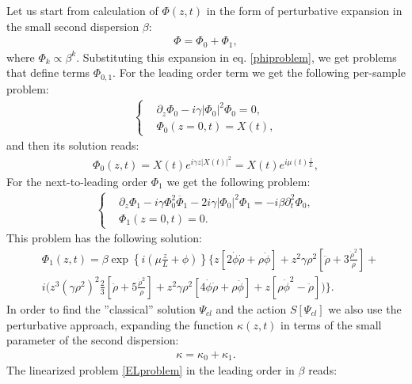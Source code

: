 \documentclass{article}
\begin{document}
Let us start from calculation of $\Phi(z,t)$ in the form of perturbative expansion in the small second dispersion $\beta$:
\begin{eqnarray}\label{Phidecomposed}
    \Phi = \Phi_{0} + \Phi_{1},
\end{eqnarray}
where $\Phi_{k} \propto \beta^{k}$. Substituting this expansion in eq. \eqref{phiproblem}, we get problems that define terms $\Phi_{0,1}$. For the leading order term we get the following per-sample problem:
\begin{eqnarray}\label{phiproblemzero}
    \begin{cases}
        &\partial_{z}\Phi_{0} - i\gamma|\Phi_{0}|^{2} \Phi_{0} = 0,\\
        &\Phi_{0}(z = 0, t) = X(t),
    \end{cases}
\end{eqnarray}
and then its solution reads: 
\begin{eqnarray}
\Phi_{0}(z,t) = X(t)e^{i\gamma z |X(t)|^{2}} = X(t)e^{i\mu(t)\frac{z}{L}},
\end{eqnarray}
For the next-to-leading order $\Phi_{1}$ we get the following problem: 
\begin{eqnarray}\label{phiproblemone}
    \begin{cases}
        &\partial_{z}\Phi_{1} -i\gamma\Phi^2_{0}\overline{\Phi}_{1} - 2i\gamma|\Phi_{0}|^2\Phi_{1} = -i\beta\partial^2_{t}\Phi_{0},\\
        &\Phi_{1}(z = 0, t) = 0.
    \end{cases}
\end{eqnarray}
This problem has the following solution: 
\begin{eqnarray}
    &\Phi_{1}(z, t)=\beta \exp\left\{i\left(\mu\frac{z}{L}+\phi\right)\right\}\Big\{z[2\dot{\phi}\dot{\rho}+\rho\ddot{\phi}]+z^2\gamma\rho^2[\ddot{\rho}+3\frac{\dot{\rho}^2}{\rho}]+\nonumber\\
    &i\Big(z^3(\gamma\rho^2)^2\frac{2}{3}[\ddot{\rho}+5\frac{\dot{\rho}^2}{\rho}]+z^2\gamma\rho^2[4\dot{\phi}\dot{\rho}+\rho\ddot{\phi}]+z[\rho\dot{\phi}^2-\ddot{\rho}]\Big)\Big\}.
\end{eqnarray}
In order to find the ''classical'' solution $\Psi_{cl}$ and the action $S[\Psi_{cl}]$ we also use the perturbative approach, expanding the function $\kappa(z,t)$ in terms of the small parameter of the second dispersion:
\begin{eqnarray}
    \kappa = \kappa_{0}+\kappa_{1}.
\end{eqnarray}
The linearized problem \eqref{ELproblem} in the leading order in $\beta$ reads: 
\end{document}
